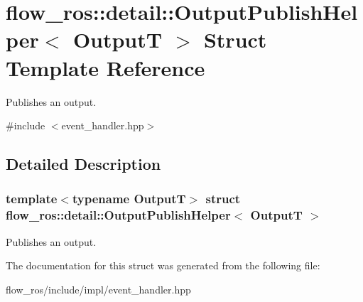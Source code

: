 \hypertarget{structflow__ros_1_1detail_1_1_output_publish_helper}{}\section{flow\+\_\+ros\+:\+:detail\+:\+:Output\+Publish\+Helper$<$ OutputT $>$ Struct Template Reference}
\label{structflow__ros_1_1detail_1_1_output_publish_helper}


Publishes an output.  




{\ttfamily \#include $<$event\+\_\+handler.\+hpp$>$}



\subsection{Detailed Description}
\subsubsection*{template$<$typename OutputT$>$\newline
struct flow\+\_\+ros\+::detail\+::\+Output\+Publish\+Helper$<$ Output\+T $>$}

Publishes an output. 

The documentation for this struct was generated from the following file\+:\begin{DoxyCompactItemize}
\item 
flow\+\_\+ros/include/impl/event\+\_\+handler.\+hpp\end{DoxyCompactItemize}
